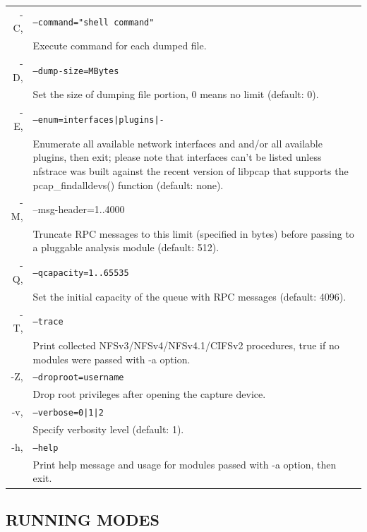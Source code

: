 \documentclass[oneside]{article}
\newcommand{\code}[1]{\texttt{#1}}
\newcommand*{\textfile}[1]{\textsf{#1}}
\newcommand*{\textprog}[1]{\textfile{#1}}
\begin{document}
\begin{tabularx}{\linewidth}{ r X }
\textprog{-C}, & \code{--command="shell command"} \\
& Execute command for each dumped file.\\
\textprog{-D}, & \code{--dump-size=MBytes}\\
& Set the size of dumping file portion, 0 means no limit (default: 0).\\
\textprog{-E}, & \code{--enum=interfaces|plugins|-}\\
& Enumerate all available network interfaces and and/or all available plugins,
then exit; please note that interfaces can't be listed unless \textprog{nfstrace} was
built against the recent version of libpcap that supports the
pcap\_findalldevs() function (default: none).\\ 
\textprog{-M}, &
\textprog{--msg-header=1..4000}\\
& Truncate RPC messages to this limit (specified in bytes) before passing to a
pluggable analysis module (default: 512).\\
\textprog{-Q}, & \code{--qcapacity=1..65535}\\
& Set the initial capacity of the queue with RPC messages (default: 4096).\\
\textprog{-T}, & \code{--trace}\\
& Print collected NFSv3/NFSv4/NFSv4.1/CIFSv2 procedures, true if no modules were
passed with -a option.\\
\textprog{-Z}, & \code{--droproot=username}\\
& Drop root privileges after opening the capture device.\\
\textprog{-v}, & \code{--verbose=0|1|2}\\
& Specify verbosity level (default: 1).\\
\textprog{-h}, & \code{--help}\\
& Print help message and usage for modules passed with -a option, then exit.\\
\end{tabularx} 

\subsection{RUNNING MODES}
\end{document}

